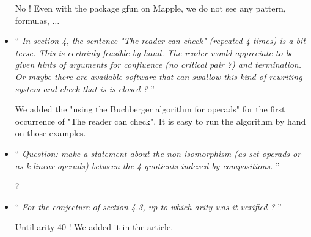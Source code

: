 \documentclass[10pt,reqno]{amsart}
\numberwithin{equation}{subsection}
\begin{document}
\begin{itemize}
No ! Even with the package gfun on Mapple, we do not
see any pattern, formulas, $\dots$
\medbreak

\item `` {\it
In section 4, the sentence "The reader can check" (repeated 4 times)
is a bit terse. This is certainly feasible by hand. The reader would
appreciate to be given hints of arguments for confluence (no critical
pair ?) and termination. Or maybe there are available software that
can swallow this kind of rewriting system and check that is is closed ?
}''
\smallbreak

We added the "using the Buchberger algorithm for operads" for the first
occurrence of "The reader can check". It is easy to run the algorithm
by hand on those examples.
\medbreak

\item `` {\it
Question: make a statement about the non-isomorphism (as set-operads
or as k-linear-operads) between the 4 quotients indexed by compositions.
}''
\smallbreak

?
\medbreak

\item `` {\it
For the conjecture of section 4.3, up to which arity was it verified ?
}''
\smallbreak

Until arity 40 ! We added it in the article.
\medbreak

\end{itemize}
\end{document}

